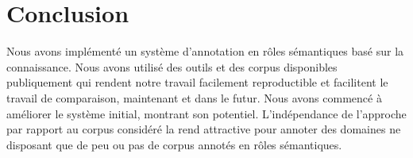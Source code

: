 \section*{Conclusion}

Nous avons implémenté un système d'annotation en rôles sémantiques basé sur la
connaissance. Nous avons utilisé des outils et des corpus disponibles
publiquement qui rendent notre travail facilement reproductible et facilitent
le travail de comparaison, maintenant et dans le futur. Nous avons commencé à
améliorer le système initial, montrant son potentiel. L'indépendance de
l'approche par rapport au corpus considéré la rend attractive pour annoter des
domaines ne disposant que de peu ou pas de corpus annotés en rôles sémantiques.
